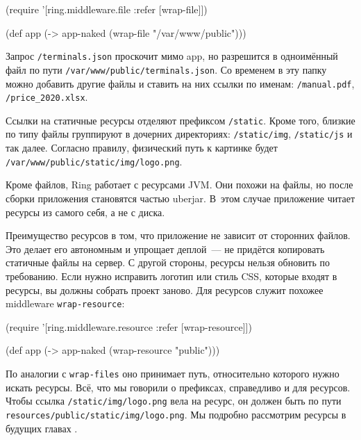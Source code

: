 \else

\begin{english}
  \begin{clojure}
(require '[ring.middleware.file :refer [wrap-file]])

(def app (-> app-naked
             (wrap-file "/var/www/public")))
  \end{clojure}
\end{english}

\fi

Запрос \verb|/terminals.json| проскочит мимо app, но разрешится в
одноимённый файл по пути \verb|/var/www/public/terminals.json|. Со
временем в эту папку можно добавить другие файлы и ставить на них ссылки по
именам: \verb|/manual.pdf|, \verb|/price_2020.xlsx|.

Ссылки на статичные ресурсы отделяют префиксом \verb|/static|. Кроме того,
близкие по типу файлы группируют в дочерних директориях: \verb|/static/img|,
\verb|/static/js| и так далее. Согласно правилу, физический путь к картинке
будет \verb|/var/www/public/static/img/logo.png|.

Кроме файлов, Ring работает с ресурсами JVM. Они похожи на файлы, но после
сборки приложения становятся частью uberjar. В~этом случае приложение читает
ресурсы из самого себя, а не с диска.

Преимущество ресурсов в том, что приложение не зависит от сторонних файлов. Это
делает его автономным и упрощает деплой~--- не придётся копировать статичные
файлы на сервер. С другой стороны, ресурсы нельзя обновить по требованию. Если
нужно исправить логотип или стиль CSS, которые входят в ресурсы, вы должны
собрать проект заново. Для ресурсов служит похожее middleware
\verb|wrap-resource|:


\begin{english}
  \begin{clojure}
(require '[ring.middleware.resource
           :refer [wrap-resource]])

(def app (-> app-naked
             (wrap-resource "public")))
  \end{clojure}
\end{english}

По аналогии с \verb|wrap-files| оно принимает путь, относительно которого нужно
искать ресурсы. Всё, что мы говорили о префиксах, справедливо и для
ресурсов. Чтобы ссылка \verb|/static/img/logo.png| вела на ресурс, он должен
быть по пути \texttt{resources/public/static\-/img/logo.png}. Мы подробно рассмотрим
ресурсы в будущих главах .

